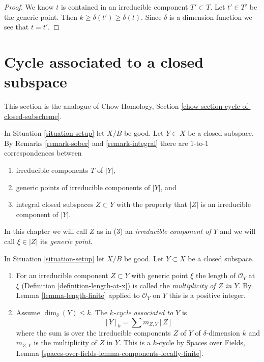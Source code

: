 \begin{proof}
We know $t$ is contained in an irreducible component $T' \subset T$.
Let $t' \in T'$ be the generic point. Then
$k \geq \delta(t') \geq \delta(t)$. Since $\delta$ is a dimension
function we see that $t = t'$.
\end{proof}



\section{Cycle associated to a closed subspace}
\label{section-cycle-of-closed-subscheme}

\noindent
This section is the analogue of
Chow Homology, Section \ref{chow-section-cycle-of-closed-subscheme}.

\begin{remark}
\label{remark-irreducible-component}
In Situation \ref{situation-setup} let $X/B$ be good.
Let $Y \subset X$ be a closed subspace. By
Remarks \ref{remark-sober} and \ref{remark-integral}
there are $1$-to-$1$ correspondences between
\begin{enumerate}
\item irreducible components $T$ of $|Y|$,
\item generic points of irreducible components of $|Y|$, and
\item integral closed subspaces $Z \subset Y$ with the property that
$|Z|$ is an irreducible component of $|Y|$.
\end{enumerate}
In this chapter we will call $Z$ as in (3) an
{\it irreducible component of $Y$}
and we will call $\xi \in |Z|$ its {\it generic point}.
\end{remark}

\begin{definition}
\label{definition-cycle-associated-to-closed-subscheme}
In Situation \ref{situation-setup} let $X/B$ be good.
Let $Y \subset X$ be a closed subspace.
\begin{enumerate}
\item For an irreducible component $Z \subset Y$ with generic point $\xi$
the length of $\mathcal{O}_Y$ at $\xi$
(Definition \ref{definition-length-at-x}) is called the
{\it multiplicity of $Z$ in $Y$}.
By Lemma \ref{lemma-length-finite} applied to $\mathcal{O}_Y$
on $Y$ this is a positive integer.
\item Assume $\dim_\delta(Y) \leq k$.
The {\it $k$-cycle associated to $Y$} is
$$
[Y]_k = \sum m_{Z, Y}[Z]
$$
where the sum is over the irreducible components $Z$ of $Y$
of $\delta$-dimension $k$ and $m_{Z, Y}$ is the multiplicity
of $Z$ in $Y$.
This is a $k$-cycle by Spaces over Fields, Lemma
\ref{spaces-over-fields-lemma-components-locally-finite}.
\end{enumerate}
\end{definition}

